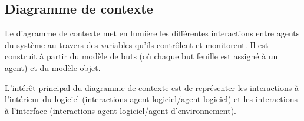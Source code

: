 \subsection{Diagramme de contexte}

	Le diagramme de contexte met en lumière les différentes interactions entre 
	agents du système au travers des variables qu'ils contrôlent et monitorent. 
	Il est construit à partir du modèle de buts (où chaque but feuille est 
	assigné à un agent) et du modèle objet.
	
	
	L'intérêt principal du diagramme de contexte est de représenter les interactions
	à l'intérieur du logiciel (interactions agent logiciel/agent logiciel) et
	les interactions à l'interface (interactions agent logiciel/agent
	d'environnement).
	
